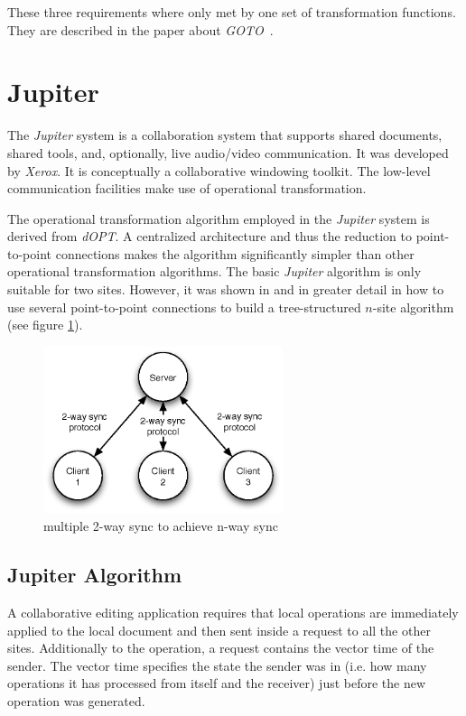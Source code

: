 These three requirements where only met by one set of transformation
functions. They are described in the paper about \emph{GOTO}~\cite{sun98a}.



\section{Jupiter}
The \emph{Jupiter} system is a collaboration system that supports shared 
documents, shared tools, and, optionally, live audio/video communication. It was 
developed by \emph{Xerox}. It is conceptually a collaborative windowing toolkit. 
The low-level communication facilities make use of operational transformation.

The operational transformation algorithm employed in the \emph{Jupiter} system is derived from \emph{dOPT}. A centralized architecture and thus the reduction to point-to-point connections makes the algorithm significantly simpler than other operational transformation algorithms. The basic \emph{Jupiter} algorithm is only suitable for two sites. However, it was shown in \cite{jupiter95} and in greater detail in \cite{netedit:thesis} how to use several point-to-point connections to build a tree-structured $n$-site algorithm (see figure \ref{fig:concepts.nway}).

\begin{figure}[htb]
 \centering
 \includegraphics[width=7cm,height=4.89cm]{../images/finalreport/concepts_nway.eps}
 \caption{multiple 2-way sync to achieve n-way sync}
 \label{fig:concepts.nway}
\end{figure}

\subsection{Jupiter Algorithm}
A collaborative editing application requires that local operations are immediately applied to the local document and then sent inside a request to all
the other sites. Additionally to the operation, a request contains the vector
time of the sender. The vector time specifies the state the sender was in
(i.e. how many operations it has processed from itself and the receiver) just
before the new operation was generated.

